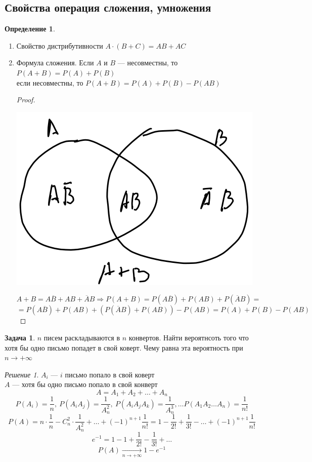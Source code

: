 \documentclass[english]{article}
\theoremstyle{plain}
\theoremstyle{remark}
\newtheorem*{solution}{Решение}
\theoremstyle{definition}
\newtheorem{task}{Задача}
\newtheorem*{definition}{Определение}
\begin{document}
\subsection{Свойства операция сложения, умножения}
\label{sec:orgc8f07d4}
\begin{definition}
\-
\begin{enumerate}
\item Свойство дистрибутивности \(A\cdot (B + C) = AB + AC\)
\item Формула сложения. Если \(A\) и \(B\) --- несовместны, то \(P(A + B) = P(A) + P(B)\) \\
если несовместны, то \(P(A + B) = P(A) + P(B) - P(AB)\)
\begin{proof}
\-
\begin{center}
\includegraphics[scale=0.4]{2_2.png}
\end{center}
\[ A + B = A\overline{B} + AB + \overline{A}B \Rightarrow P(A + B) = P(A\overline{B}) + P(AB) + P(\overline{A}B) = \]
\[ = P(A\overline{B}) + P(AB) + (P(\overline{A}B) + P(AB)) - P(AB) = P(A) + P(B) - P(AB) \]
\end{proof}
\end{enumerate}
\end{definition}
\begin{task}
\(n\) писем раскладываются в \(n\) конвертов. Найти вероятнсоть того что
хотя бы одно письмо попадет в свой коверт. Чему равна эта вероятность
при \(n \to + \infty\)
\end{task}
\begin{solution}
\(A_i\) --- \(i\) письмо попало в свой коверт \\
\(A\) --- хотя бы одно письмо попало в свой конверт
\[ A = A_1 + A_2 + \dots + A_n \]
\[ P(A_i) = \frac{1}{n},\ P(A_iA_j) = \frac{1}{A^2_n},\ P(A_iA_jA_k) = \frac{1}{A^3_n}, \dots P(A_1A_2\dots A_n) = \frac{1}{n!}\]
\[ P(A) = n\cdot\frac{1}{n} - C^2_n\cdot\frac{1}{A^2_n} + \dots + (-1)^{n + 1}\frac{1}{n!} = 1 - \frac{1}{2!} + \frac{1}{3!} - \dots + (-1)^{n + 1}\frac{1}{n!} \]
\[ e^{-1} = 1 - 1 + \frac{1}{2!} - \frac{1}{3!} + \dots \]
\[ P(A) \xrightarrow[n \to +\infty]{} 1 - e^{-1} \]
\end{solution}
\end{document}
